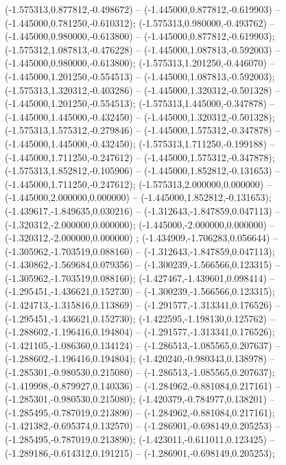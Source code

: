  (-1.575313,0.877812,-0.498672) -- (-1.445000,0.877812,-0.619903) -- (-1.445000,0.781250,-0.610312);
 (-1.575313,0.980000,-0.493762) -- (-1.445000,0.980000,-0.613800) -- (-1.445000,0.877812,-0.619903);
 (-1.575312,1.087813,-0.476228) -- (-1.445000,1.087813,-0.592003) -- (-1.445000,0.980000,-0.613800);
 (-1.575313,1.201250,-0.446070) -- (-1.445000,1.201250,-0.554513) -- (-1.445000,1.087813,-0.592003);
 (-1.575313,1.320312,-0.403286) -- (-1.445000,1.320312,-0.501328) -- (-1.445000,1.201250,-0.554513);
 (-1.575313,1.445000,-0.347878) -- (-1.445000,1.445000,-0.432450) -- (-1.445000,1.320312,-0.501328);
 (-1.575313,1.575312,-0.279846) -- (-1.445000,1.575312,-0.347878) -- (-1.445000,1.445000,-0.432450);
 (-1.575313,1.711250,-0.199188) -- (-1.445000,1.711250,-0.247612) -- (-1.445000,1.575312,-0.347878);
 (-1.575313,1.852812,-0.105906) -- (-1.445000,1.852812,-0.131653) -- (-1.445000,1.711250,-0.247612);
 (-1.575313,2.000000,0.000000) -- (-1.445000,2.000000,0.000000) -- (-1.445000,1.852812,-0.131653);
 (-1.439617,-1.849635,0.030216) -- (-1.312643,-1.847859,0.047113) -- (-1.320312,-2.000000,0.000000);
 (-1.445000,-2.000000,0.000000) -- (-1.320312,-2.000000,0.000000) ;
 (-1.434909,-1.706283,0.056644) -- (-1.305962,-1.703519,0.088160) -- (-1.312643,-1.847859,0.047113);
 (-1.430862,-1.569684,0.079356) -- (-1.300239,-1.566566,0.123315) -- (-1.305962,-1.703519,0.088160);
 (-1.427467,-1.439601,0.098414) -- (-1.295451,-1.436621,0.152730) -- (-1.300239,-1.566566,0.123315);
 (-1.424713,-1.315816,0.113869) -- (-1.291577,-1.313341,0.176526) -- (-1.295451,-1.436621,0.152730);
 (-1.422595,-1.198130,0.125762) -- (-1.288602,-1.196416,0.194804) -- (-1.291577,-1.313341,0.176526);
 (-1.421105,-1.086360,0.134124) -- (-1.286513,-1.085565,0.207637) -- (-1.288602,-1.196416,0.194804);
 (-1.420240,-0.980343,0.138978) -- (-1.285301,-0.980530,0.215080) -- (-1.286513,-1.085565,0.207637);
 (-1.419998,-0.879927,0.140336) -- (-1.284962,-0.881084,0.217161) -- (-1.285301,-0.980530,0.215080);
 (-1.420379,-0.784977,0.138201) -- (-1.285495,-0.787019,0.213890) -- (-1.284962,-0.881084,0.217161);
 (-1.421382,-0.695374,0.132570) -- (-1.286901,-0.698149,0.205253) -- (-1.285495,-0.787019,0.213890);
 (-1.423011,-0.611011,0.123425) -- (-1.289186,-0.614312,0.191215) -- (-1.286901,-0.698149,0.205253);
